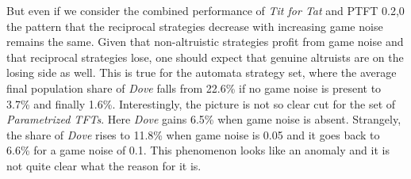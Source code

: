 But even if we consider the combined performance of {\em Tit for Tat} and PTFT
0.2,0 the pattern that the reciprocal strategies decrease with increasing game
noise remains the same. Given that non-altruistic strategies profit from game
noise and that reciprocal strategies lose, one should expect that genuine
altruists are on the losing side as well. This is true for the automata
strategy set, where the average final population share of {\em Dove} falls
from 22.6\% if no game noise is present to 3.7\% and finally 1.6\%.
Interestingly, the picture is not so clear cut for the set of {\em
  Parametrized TFTs}. Here {\em Dove} gains 6.5\% when game noise is absent.
Strangely, the share of {\em Dove} rises to 11.8\% when game noise is 0.05 and
it goes back to 6.6\% for a game noise of 0.1. This phenomenon looks like an
anomaly and it is not quite clear what the reason for it is.

